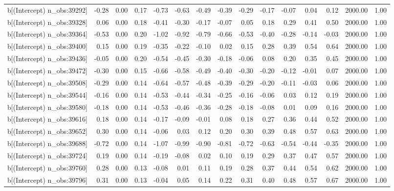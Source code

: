 \begin{table}[ht]
\begin{tabular}{rrrrrrrrrrrrrrr}
  b[(Intercept) n\_obs:39292] & -0.28 & 0.00 & 0.17 & -0.73 & -0.63 & -0.49 & -0.39 & -0.29 & -0.17 & -0.07 & 0.04 & 0.12 & 2000.00 & 1.00 \\ 
  b[(Intercept) n\_obs:39328] & 0.06 & 0.00 & 0.18 & -0.41 & -0.30 & -0.17 & -0.07 & 0.05 & 0.18 & 0.29 & 0.41 & 0.50 & 2000.00 & 1.00 \\ 
  b[(Intercept) n\_obs:39364] & -0.53 & 0.00 & 0.20 & -1.02 & -0.92 & -0.79 & -0.66 & -0.53 & -0.40 & -0.28 & -0.14 & -0.03 & 2000.00 & 1.00 \\ 
  b[(Intercept) n\_obs:39400] & 0.15 & 0.00 & 0.19 & -0.35 & -0.22 & -0.10 & 0.02 & 0.15 & 0.28 & 0.39 & 0.54 & 0.64 & 2000.00 & 1.00 \\ 
  b[(Intercept) n\_obs:39436] & -0.05 & 0.00 & 0.20 & -0.54 & -0.45 & -0.30 & -0.18 & -0.06 & 0.08 & 0.20 & 0.35 & 0.45 & 2000.00 & 1.00 \\ 
  b[(Intercept) n\_obs:39472] & -0.30 & 0.00 & 0.15 & -0.66 & -0.58 & -0.49 & -0.40 & -0.30 & -0.20 & -0.12 & -0.01 & 0.07 & 2000.00 & 1.00 \\ 
  b[(Intercept) n\_obs:39508] & -0.29 & 0.00 & 0.14 & -0.64 & -0.57 & -0.48 & -0.39 & -0.29 & -0.20 & -0.11 & -0.03 & 0.06 & 2000.00 & 1.00 \\ 
  b[(Intercept) n\_obs:39544] & -0.16 & 0.00 & 0.14 & -0.53 & -0.44 & -0.34 & -0.25 & -0.16 & -0.06 & 0.03 & 0.12 & 0.19 & 2000.00 & 1.00 \\ 
  b[(Intercept) n\_obs:39580] & -0.18 & 0.00 & 0.14 & -0.53 & -0.46 & -0.36 & -0.28 & -0.18 & -0.08 & 0.01 & 0.09 & 0.16 & 2000.00 & 1.00 \\ 
  b[(Intercept) n\_obs:39616] & 0.18 & 0.00 & 0.14 & -0.17 & -0.09 & -0.01 & 0.08 & 0.18 & 0.27 & 0.36 & 0.44 & 0.52 & 2000.00 & 1.00 \\ 
  b[(Intercept) n\_obs:39652] & 0.30 & 0.00 & 0.14 & -0.06 & 0.03 & 0.12 & 0.20 & 0.30 & 0.39 & 0.48 & 0.57 & 0.63 & 2000.00 & 1.00 \\ 
  b[(Intercept) n\_obs:39688] & -0.72 & 0.00 & 0.14 & -1.07 & -0.99 & -0.90 & -0.81 & -0.72 & -0.63 & -0.54 & -0.44 & -0.35 & 2000.00 & 1.00 \\ 
  b[(Intercept) n\_obs:39724] & 0.19 & 0.00 & 0.14 & -0.19 & -0.08 & 0.02 & 0.10 & 0.19 & 0.29 & 0.37 & 0.47 & 0.57 & 2000.00 & 1.00 \\ 
  b[(Intercept) n\_obs:39760] & 0.28 & 0.00 & 0.13 & -0.08 & 0.01 & 0.11 & 0.19 & 0.28 & 0.37 & 0.44 & 0.54 & 0.62 & 2000.00 & 1.00 \\ 
  b[(Intercept) n\_obs:39796] & 0.31 & 0.00 & 0.13 & -0.04 & 0.05 & 0.14 & 0.22 & 0.31 & 0.40 & 0.48 & 0.57 & 0.67 & 2000.00 & 1.00 \\ 

\end{tabular}
\end{table}
